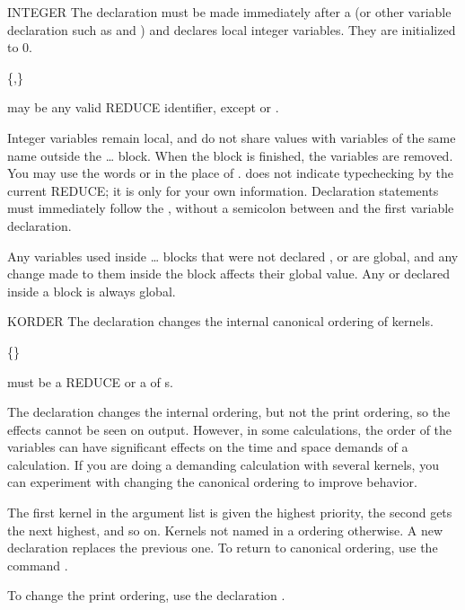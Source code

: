 \begin{Declaration}[integer]{INTEGER}
The  declaration must be made immediately after a
 (or other variable declaration such as 
and ) and declares local integer variables.  They are
initialized to 0.
\begin{Syntax}
 \{,\}\optional
\end{Syntax}

 may be any valid REDUCE identifier, except
 or .

\begin{Comments}
Integer variables remain local, and do not share values with variables of
the same name outside the \ldots{} block.  When the
block is finished, the variables are removed.  You may use the words
 or  in the place of .
 does not indicate typechecking by the
current REDUCE; it is only for your own information.  Declaration
statements must immediately follow the , without a semicolon
between  and the first variable declaration.

Any variables used inside \ldots{} blocks that were not
declared ,  or  are global, and any
change made to them inside the block affects their global value.  Any
 or  declared inside a block is always global.
\end{Comments}
\end{Declaration}


\begin{Declaration}[korder]{KORDER}
The  declaration changes the internal canonical ordering of
kernels.
\begin{Syntax}
 \{\name{,}\}\optional
\end{Syntax}

 must be a REDUCE  or a  of
s.

\begin{Comments}
The declaration  changes the internal ordering, but not the print
ordering, so the effects cannot be seen on output.  However, in some 
calculations, the order of the variables can have significant effects on the 
time and space demands of a calculation.  If you are doing a demanding 
calculation with several kernels, you can experiment with changing the 
canonical ordering to improve behavior.

The first kernel in the argument list is given the highest priority, the
second gets the next highest, and so on.  Kernels not named in a
 ordering otherwise.  A new  declaration replaces 
the previous one.  To return to canonical ordering, use the command 
.

To change the print ordering, use the declaration .
\end{Comments}
\end{Declaration}


